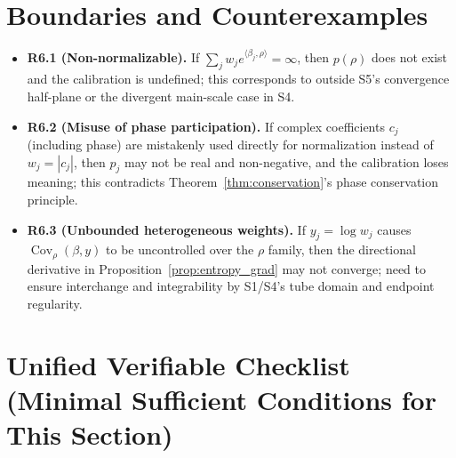 \documentclass[11pt,a4paper]{article}
\theoremstyle{remark}
\DeclareMathOperator{\Cov}{Cov}
\begin{document}
\section{Boundaries and Counterexamples}

\begin{itemize}
\item \textbf{R6.1 (Non-normalizable).} If $\sum_j w_j e^{\langle \beta_j,\rho\rangle}=\infty$, then $p(\rho)$ does not exist and the calibration is undefined; this corresponds to outside S5's convergence half-plane or the divergent main-scale case in S4.

\item \textbf{R6.2 (Misuse of phase participation).} If complex coefficients $c_j$ (including phase) are mistakenly used directly for normalization instead of $w_j=|c_j|$, then $p_j$ may not be real and non-negative, and the calibration loses meaning; this contradicts Theorem~\ref{thm:conservation}'s phase conservation principle.

\item \textbf{R6.3 (Unbounded heterogeneous weights).} If $y_j=\log w_j$ causes $\Cov_\rho(\beta,y)$ to be uncontrolled over the $\rho$ family, then the directional derivative in Proposition~\ref{prop:entropy_grad} may not converge; need to ensure interchange and integrability by S1/S4's tube domain and endpoint regularity.
\end{itemize}

\section{Unified Verifiable Checklist (Minimal Sufficient Conditions for This Section)}
\end{document}
